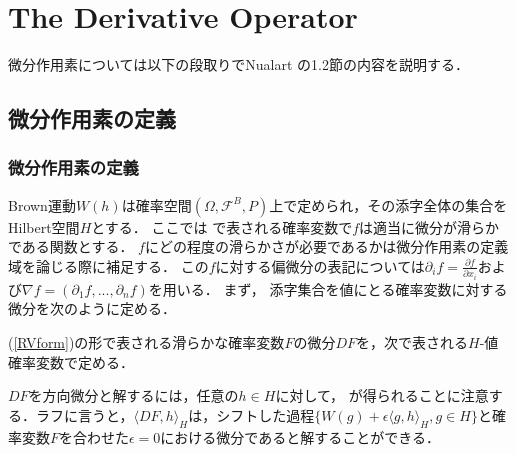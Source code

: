 \section{The Derivative Operator}
微分作用素については以下の段取りでNualart\cite{Nualart2006} の1.2節の内容を説明する．

\subsection{微分作用素の定義}
\subsubsection{微分作用素の定義}
Brown運動$W(h)$は確率空間$(\Omega,\mathcal{F}^B,P)$上で定められ，その添字全体の集合をHilbert空間$H$とする．
ここでは
で表される確率変数で$f$は適当に微分が滑らかである関数とする．
$f$にどの程度の滑らかさが必要であるかは微分作用素の定義域を論じる際に補足する．
この$f$に対する偏微分の表記については$\partial_if=\frac{\partial f}{\partial x_i}$および$\nabla f=(\partial_1f,...,\partial_nf)$を用いる．
まず，
添字集合を値にとる確率変数に対する微分を次のように定める．
\begin{definition}\label{def1.2.1}%
(\ref{RVform})の形で表される滑らかな確率変数$F$の微分$DF$を，次で表される$H$-値確率変数で定める．
\end{definition}
$DF$を方向微分と解するには，任意の$h\in H$に対して，
\eq{\langle DF,h\rangle_H
	&=\lim_{\epsilon\rightarrow0}\frac{1}{\epsilon}\left[f(W(h_1)+\epsilon\left\langle h_1,h\right\rangle_H,...,W(h_n)+\epsilon\left\langle h_n,h\right\rangle_H)-f(W(h_1),...,W(h_n))\right].}
が得られることに注意する．ラフに言うと，$\langle DF,h\rangle_H$は，シフトした過程$\{W(g)+\epsilon\langle g,h\rangle_H,g\in H\}$と確率変数$F$を合わせた$\epsilon=0$における微分であると解することができる．

